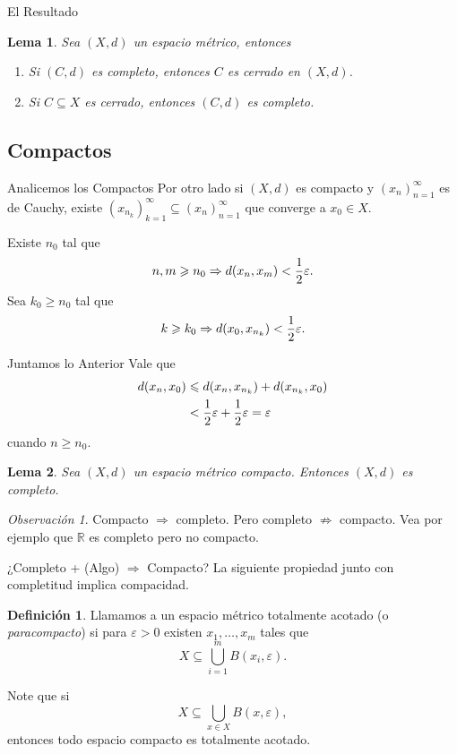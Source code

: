 \documentclass[utf8]{beamer}
\theoremstyle{plain}
\newtheorem{Lem}{Lema}                 %
\theoremstyle{definition}
\newtheorem{Def}{Definición}           %
\theoremstyle{remark}
\newtheorem{Rmk}[Th]{Observación}      %
\numberwithin{equation}{section}
\newcommand{\eps}{\varepsilon}          %
\newcommand{\bR}{\mathbb{R}}    %
\renewcommand{\geq}{\geqslant}          %
\renewcommand{\leq}{\leqslant}          %
\newcommand{\To}{\Rightarrow}
\newcommand{\half}{{\mathchoice{\nhalf}{\thalf}{\shalf}{\shalf}}} %
\newcommand{\nhalf}{\frac{1}{2}}
\newcommand{\shalf}{{\scriptstyle\frac{1}{2}}} %
\newcommand{\thalf}{{\tfrac{1}{2}}} %
\newcommand{\suck}{_{k=1}^\infty} %
\newcommand{\sucn}{_{n=1}^\infty} %
\begin{document}
\begin{frame}{El Resultado}
  \begin{Lem}\label{lem:completoYCerrado}
    Sea $(X,d)$ un espacio métrico, entonces 
    \begin{enumerate}
      \item Si $(C,d)$ es completo, entonces $C$ es cerrado en $(X,d)$.
      \item Si $C\subseteq X$ es cerrado, entonces $(C,d)$ es completo.
    \end{enumerate}
  \end{Lem}
\end{frame}

\subsection{Compactos}

\begin{frame}{Analicemos los Compactos}
  Por otro lado si $(X,d)$ es compacto y $(x_n)\sucn$ es de Cauchy, existe $(x_{n_k})\suck\subseteq(x_n)\sucn$ que converge a $x_0\in X$.\par 
  Existe $n_0$ tal que 
  $$n,m\geq n_0\To d(x_n,x_m)<\half\eps.$$
  Sea $k_0\geq n_0$ tal que 
  $$k\geq k_0\To d(x_0,x_{n_k})<\half\eps.$$
\end{frame}

\begin{frame}{Juntamos lo Anterior}
  Vale que 
  \begin{align*}
    d(x_n,x_0)&\leq  d(x_n,x_{n_k})+d(x_{n_k},x_0)\\
    &<\half\eps+\half\eps=\eps
  \end{align*}
  cuando $n\geq n_0$. 
  \begin{Lem}\label{lem:compactoToCompleto}
    Sea $(X,d)$ un espacio métrico compacto. Entonces $(X,d)$ es completo.
  \end{Lem}

  \begin{Rmk}
    Compacto $\To$ completo. Pero completo $\not\To$ compacto. Vea por ejemplo que $\bR$ es completo pero no compacto. 
  \end{Rmk}
\end{frame}

\begin{frame}{¿Completo + (Algo) $\To$ Compacto?}
  La siguiente propiedad junto con completitud implica compacidad.
  \begin{Def}\label{def:paracompacidad}
    Llamamos a un espacio métrico \alert{totalmente acotado} (o \emph{paracompacto}) si para $\eps>0$ existen $x_1,\dots,x_m$ tales que
    $$X\subseteq \bigcup_{i=1}^mB(x_i,\eps).$$
  \end{Def}
  Note que si
  $$X\subseteq \bigcup_{x\in X}B(x,\eps),$$
  entonces todo espacio compacto es totalmente acotado.
\end{frame}
\end{document}
